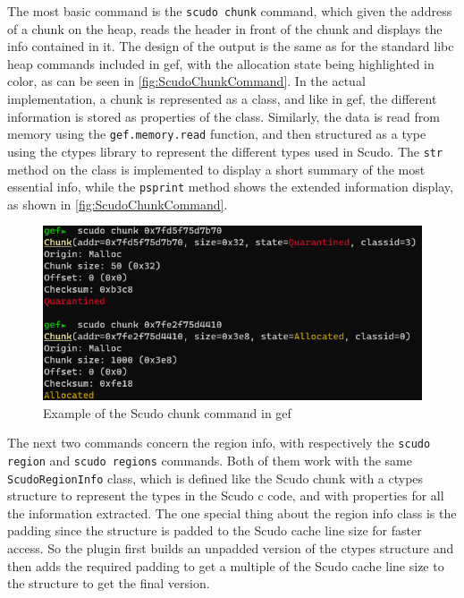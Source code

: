 \documentclass[a4paper,11pt,oneside]{report}
\begin{document}
The most basic command is the \verb|scudo chunk| command, which given the address
of a chunk on the heap, reads the header in front of the chunk and displays
the info contained in it. The design of the output is the same as for the
standard libc heap commands included in gef, with the allocation state being
highlighted in color, as can be seen in \autoref{fig:ScudoChunkCommand}.
In the actual implementation, a chunk is represented as a class, and like in
gef, the different information is stored as properties of the class. Similarly,
the data is read from memory using the \verb|gef.memory.read| function, and then
structured as a type using the ctypes library to represent the different types
used in Scudo. The \verb|str| method on the class is implemented to display a short
summary of the most essential info, while the \verb|psprint| method shows the
extended information display, as shown in \autoref{fig:ScudoChunkCommand}.

\begin{figure}[h!]
  \centering
  \includegraphics[width=\linewidth]{figures/ScudoChunkCommand.png}
  \caption{Example of the Scudo chunk command in gef}
  \label{fig:ScudoChunkCommand}
\end{figure}

The next two commands concern the region info, with respectively the
\verb|scudo region| and \verb|scudo regions| commands. Both of them work with the same
\verb|ScudoRegionInfo| class, which is defined like the Scudo chunk with a ctypes
structure to represent the types in the Scudo c code, and with properties for
all the information extracted. The one special thing about the region info
class is the padding since the structure is padded to the Scudo cache line
size for faster access. So the plugin first builds an unpadded version of the
ctypes structure and then adds the required padding to get a multiple of the
Scudo cache line size to the structure to get the final version.
\end{document}
